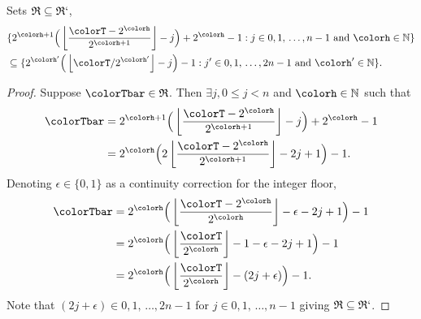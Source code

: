 \begin{sublemma}
\label{thm:tilted-rsubset}
Sets $\mathfrak{R} \subseteq \mathfrak{R}`$,
\begin{align*}
&\{
  2^{\colorh + 1}\Big( \left\lfloor\frac{\colorT - 2^{\colorh}}{2^{\colorh + 1}} \right\rfloor - j\Big) + 2^{\colorh} - 1
  :
  j \in 0,1,\,\ldots,n-1
  \text{ and }
  \colorh \in \mathbb{N}
\}\\
&\subseteq
\{
  2^{\colorh'}\Big(\left\lfloor \colorT / 2^{\colorh'} \right\rfloor - j\Big) - 1
  :
  j' \in 0,1,\,\ldots,2n-1
  \text{ and }
  \colorh' \in \mathbb{N}
\}.
\end{align*}
\end{sublemma}
\begin{proof}
Suppose $\colorTbar \in \mathfrak{R}$.
Then $\exists j,  0 \leq j < n$ and $\colorh \in \mathbb{N}$ such that
\begin{align*}
\colorTbar
&= 2^{\colorh + 1}\Big(\left\lfloor \frac{\colorT - 2^{\colorh}}{2^{\colorh + 1}} \right\rfloor - j \Big) + 2^{\colorh} - 1\\
&= 2^{\colorh} \Big(2\left\lfloor \frac{\colorT - 2^{\colorh}}{2^{\colorh + 1}} \right\rfloor  - 2j + 1 \Big) - 1.
\end{align*}
Denoting $\epsilon \in \{0, 1\}$ as a continuity correction for the integer floor,
\begin{align*}
\colorTbar
&= 2^{\colorh} \Big( \left\lfloor \frac{\colorT - 2^{\colorh}}{2^{\colorh}} \right\rfloor - \epsilon  - 2j + 1 \Big) - 1\\
&= 2^{\colorh} \Big( \left\lfloor \frac{\colorT}{2^{\colorh}} \right\rfloor - 1 - \epsilon - 2j + 1 \Big) - 1\\
&= 2^{\colorh} \Big(\left\lfloor \frac{\colorT}{2^{\colorh}}\right\rfloor - (2j + \epsilon) \Big) - 1.
\end{align*}
Note that $(2j + \epsilon) \in 0,1,\,\ldots,2n-1$ for $j \in 0,1,\,\ldots,n-1$ giving $\mathfrak{R} \subseteq \mathfrak{R}`$.
\end{proof}

